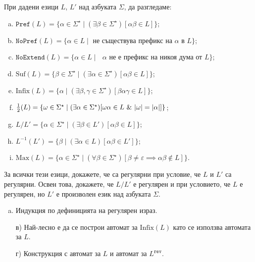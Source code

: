 \begin{problem}
  При дадени езици $L$, $L'$ над азбуката $\Sigma$, да разгледаме:
  \begin{enumerate}[a)]
  \item
    $\texttt{Pref}(L) = \{\alpha \in \Sigma^\star \mid (\exists \beta \in \Sigma^\star)[\alpha\beta \in L]\}$;
  \item
    $\texttt{NoPref}(L) = \{\alpha \in L \mid \text{ не съществува префикс на $\alpha$ в $L$}\}$;
  \item
    $\texttt{NoExtend}(L) = \{\alpha \in L \mid \text{ $\alpha$ не е префикс на никоя дума от $L$}\}$;
  \item
    $\mbox{Suf}(L) = \{\beta \in \Sigma^\star \mid (\exists \alpha \in \Sigma^\star)[\alpha\beta \in L]\}$;
  \item
    $\text{Infix}(L) = \{\alpha \mid (\exists \beta,\gamma \in \Sigma^\star)[\beta\alpha\gamma \in L]\}$;
  \item 
    $\frac{1}{2}(L) = \{\omega \in \Sigma^\star \mid (\exists \alpha \in \Sigma^\star)[\omega\alpha \in L\ \&\ \abs{\omega} = \abs{\alpha}]\}$;
  \item
    $L/L' = \{\alpha \in \Sigma^\star \mid (\exists \beta \in L')[\alpha\beta \in L ] \}$;
  \item
    $L^{-1}(L') = \{ \beta \mid (\exists \alpha \in L)[ \alpha\beta \in L']\}$;
  \item
    $\mbox{Max}(L) = \{\alpha \in \Sigma^\star \mid (\forall \beta\in\Sigma^\star)[\beta \neq \varepsilon\implies \alpha\beta \not\in L]\}$.
  \end{enumerate}
  За всички тези езици, докажете, че са регулярни при условие, че $L$ и $L'$ са регулярни.
  Освен това, докажете, че $L/L'$ е регулярен и при условието, че $L$ е регулярен, но $L'$ е произволен език над азбуката $\Sigma$.
\end{problem}
\begin{hint}
  \begin{enumerate}[a)]
  \item 
    Индукция по дефиницията на регулярен израз.
  \item[в)]
    Най-лесно е да се построи автомат за $\text{Infix}(L)$ като се използва автомата за $L$.
  \item[г)]
    Конструкция с автомат за $L$ и автомат за $L^{\texttt{rev}}$.
  \end{enumerate}
\end{hint}

